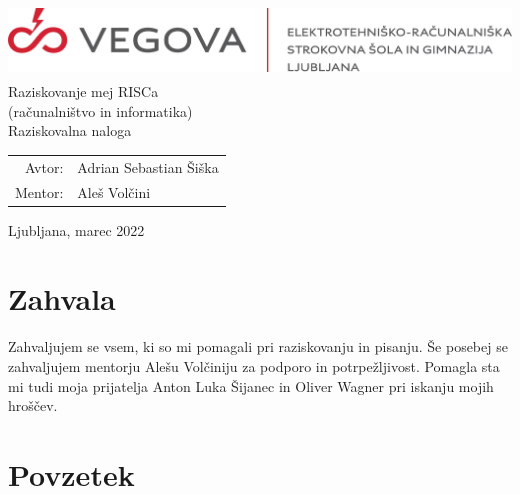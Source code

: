 \documentclass[12pt]{article}
\begin{document}
\linespread{1.25}
\begin{titlepage}
  \begin{center}
    \includegraphics[height=2cm]{slike/vegova.png}\\
    \Huge
    \vspace*{6cm}
    Raziskovanje mej RISCa\\
    \Large
    (računalništvo in informatika)\\
    Raziskovalna naloga\\
  \end{center}
  \vspace{8cm}
  \begin{tabular}{rl}
    Avtor: & Adrian Sebastian Šiška\\
    Mentor: & Aleš Volčini
  \end{tabular}
  \vspace{1cm}
  \begin{center}
    Ljubljana, marec 2022
  \end{center}
\end{titlepage}

\pagebreak
{}

\tableofcontents

\pagebreak

\listoffigures

\pagebreak

\section{Zahvala}

Zahvaljujem se vsem, ki so mi pomagali pri raziskovanju in pisanju.
Še posebej se zahvaljujem mentorju Alešu Volčiniju za podporo in potrpežljivost.
Pomagla sta mi tudi moja prijatelja Anton Luka Šijanec in Oliver Wagner pri iskanju mojih hroščev.

\pagebreak

\section{Povzetek}
\pagebreak

\end{document}
